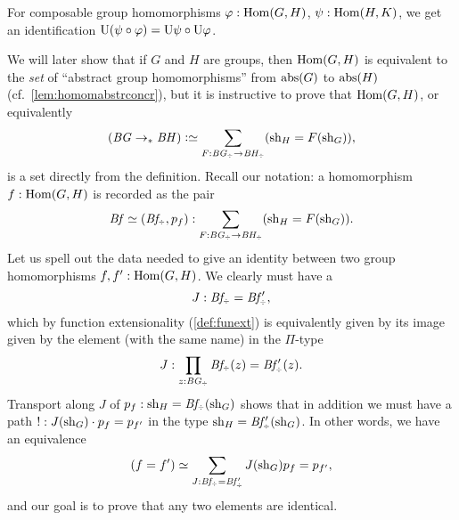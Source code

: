 \begin{corollary}\label{cor:USym-compose}
For composable group homomorphisms
$\varphi : \Hom(G,H)$, $\psi:\Hom(H,K)$,
we get an identification
$\mathrm{U}(\psi\circ\varphi) = \mathrm{U}\psi \circ \mathrm{U}\varphi$.
\end{corollary}
\begin{example}
  We will later show that if $G$ and $H$ are groups, then $\Hom(G,H)$
  is equivalent to the \emph{set} of ``abstract group homomorphisms''
  from $\mathrm{abs}(G)$ to $\mathrm{abs}(H)$ (cf.\ \cref{lem:homomabstrconcr}),
  but it is instructive to prove that $\Hom(G,H)$, or equivalently
  \[
    (\BG\ptdto\BH) \defequi
    \sum_{F:\BG_\div\to \BH_\div}(\shape_H=F(\shape_G)),
  \]
  is a set directly from the definition. Recall our notation: a
  homomorphism $f:\Hom(G,H)$ is recorded as the pair
  \begin{displaymath}
    \Bf \jdeq (\Bf_\div,p_f):\sum_{F:\BG_\div\to \BH_\div}(\shape_H=F(\shape_G)).
  \end{displaymath}
  Let us spell out the data needed to give an identity between two
  group homomorphisms $f,f':\Hom(G,H)$.  We clearly must have a
  $$J:\Bf_\div=\Bf_\div',$$
  which by function extensionality (\cref{def:funext}) is equivalently
  given by its image given by the element (with the same
  name) in the $\Pi$-type
  $$J:\prod_{z:\BG_\div}\Bf_\div(z)=\Bf'_\div(z).$$
Transport along $J$ of $p_f:\shape_H=\Bf_\div(\shape_G)$ shows that in
  addition we must have a path $!:J(\mathrm{sh}_G)\cdot p_f=p_{f'}$
 in the
  type ${\shape_H=\Bf'_\div(\shape_G)}$.
  In other words, we have an equivalence
  $$(f=f')\simeq \sum_{J:\Bf_\div=\Bf'_\div}J(\shape_G)p_f=p_{f'},$$
  and our goal is to prove that any two elements are identical.

\end{example}
